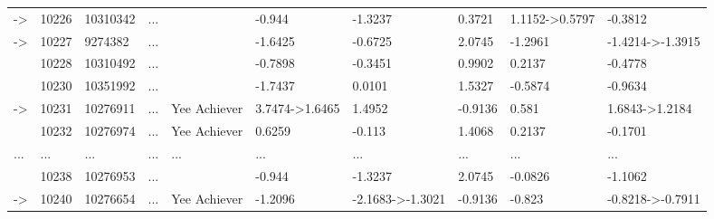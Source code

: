\documentclass[6pt]{article}
\begin{document}
\begin{landscape}
{\begin{longtable}{llllllllll}
-\textgreater &10226&10310342&...&&-0.944&-1.3237&0.3721&1.1152-\textgreater 0.5797&-0.3812\tabularnewline
-\textgreater &10227&9274382&...&&-1.6425&-0.6725&2.0745&-1.2961&-1.4214-\textgreater -1.3915\tabularnewline
&10228&10310492&...&&-0.7898&-0.3451&0.9902&0.2137&-0.4778\tabularnewline
\newpage
&10230&10351992&...&&-1.7437&0.0101&1.5327&-0.5874&-0.9634\tabularnewline
-\textgreater &10231&10276911&...&Yee Achiever&3.7474-\textgreater 1.6465&1.4952&-0.9136&0.581&1.6843-\textgreater 1.2184\tabularnewline
&10232&10276974&...&Yee Achiever&0.6259&-0.113&1.4068&0.2137&-0.1701\tabularnewline
...&...&...&...&...&...&...&...&...&...\tabularnewline
&10238&10276953&...&&-0.944&-1.3237&2.0745&-0.0826&-1.1062\tabularnewline
-\textgreater &10240&10276654&...&Yee Achiever&-1.2096&-2.1683-\textgreater -1.3021&-0.9136&-0.823&-0.8218-\textgreater -0.7911\tabularnewline
\hline
\end{longtable}}\end{landscape}
\end{document}
